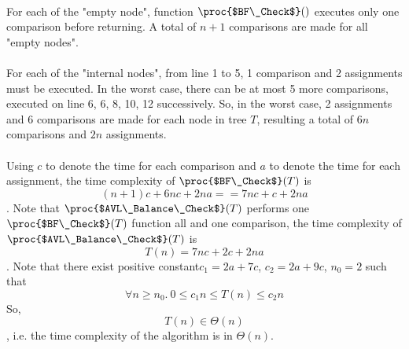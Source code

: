 \documentclass[11pt, answers]{exam}
\theoremstyle{plain}
\theoremstyle{definition}
\begin{document}
\begin{questions}
\begin{solution}
\\
For each of the "empty node", function $\proc{$BF\_Check$}()$ executes only one comparison before returning. A total of $n+1$ comparisons are made for all "empty nodes".\\
\\
For each of the "internal nodes", from line 1 to 5, 1 comparison and 2 assignments must be executed. In the worst case, there can be at most 5 more comparisons, executed on line 6, 6, 8, 10, 12 successively. So, in the worst case, 2 assignments and 6 comparisons are made for each node in tree $T$, resulting a total of $6n$ comparisons and $2n$ assignments.\\
\\
Using $c$ to denote the time for each comparison and $a$ to denote the time for each assignment, the time complexity of $\proc{$BF\_Check$}(T)$ is $$(n+1)c+6nc+2na == 7nc+c+2na$$. Note that $\proc{$AVL\_Balance\_Check$}(T)$ performs one $\proc{$BF\_Check$}(T)$ function all and one comparison, the time complexity of $\proc{$AVL\_Balance\_Check$}(T)$ is $$T(n) = 7nc+2c+2na$$.
Note that there exist positive constant$c_1=2a+7c$, $c_2=2a+9c$, $n_0=2$ such that $$\forall n\geq n_0 .\  0\leq c_1n \leq T(n) \leq c_2n$$
So, $$T(n) \in \Theta(n)$$, i.e. the time complexity of the algorithm is in $\Theta(n)$.
\end{solution}

\begin{solution}

\end{solution}

\end{questions}
\end{document}
